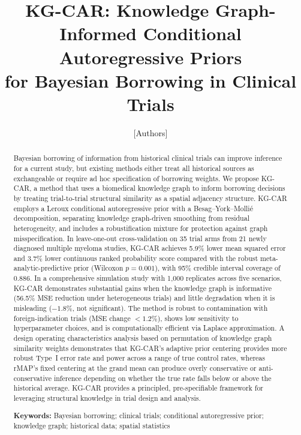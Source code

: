 \documentclass[12pt]{article}
\title{KG-CAR: Knowledge Graph-Informed Conditional Autoregressive Priors \\
for Bayesian Borrowing in Clinical Trials}
\author{
  [Authors]
}
\date{}
\begin{document}
\maketitle

\begin{abstract}
Bayesian borrowing of information from historical clinical trials can improve inference for a current study, but existing methods either treat all historical sources as exchangeable or require ad hoc specification of borrowing weights. We propose KG-CAR, a method that uses a biomedical knowledge graph to inform borrowing decisions by treating trial-to-trial structural similarity as a spatial adjacency structure. KG-CAR employs a Leroux conditional autoregressive prior with a Besag--York--Molli\'{e} decomposition, separating knowledge graph-driven smoothing from residual heterogeneity, and includes a robustification mixture for protection against graph misspecification. In leave-one-out cross-validation on 35 trial arms from 21 newly diagnosed multiple myeloma studies,
KG-CAR achieves 5.9\% lower mean squared error and 3.7\% lower continuous ranked probability score compared with the robust meta-analytic-predictive prior (Wilcoxon $p = 0.001$), with 95\% credible interval coverage of 0.886. In a comprehensive simulation study with 1{,}000 replicates across five scenarios, KG-CAR demonstrates substantial gains when the knowledge graph is informative (56.5\% MSE reduction under heterogeneous trials) and little degradation when it is misleading ($-1.8\%$, not significant). The method is robust to contamination with foreign-indication trials (MSE change $< 1.2\%$), shows low sensitivity to hyperparameter choices, and is computationally efficient via Laplace approximation. A design operating characteristics analysis based on permutation of knowledge graph similarity weights demonstrates that KG-CAR's adaptive prior centering provides more robust Type~I error rate and power across a range of true control rates, whereas rMAP's fixed centering at the grand mean can produce overly conservative or anti-conservative inference depending on whether the true rate falls below or above the historical average. KG-CAR provides a principled, pre-specifiable framework for leveraging structural knowledge in trial design and analysis.

\vspace{6pt}
\noindent \textbf{Keywords:} Bayesian borrowing; clinical trials; conditional autoregressive prior; knowledge graph; historical data; spatial statistics
\end{abstract}
\end{document}
